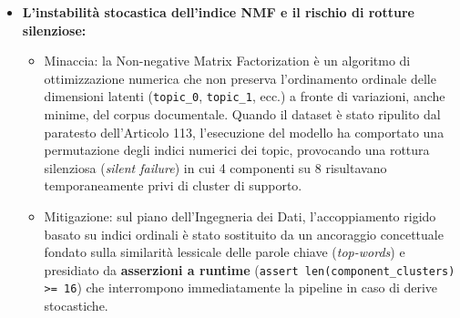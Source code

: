 \documentclass[12pt,a4paper,oneside]{report}
\begin{document}
\begin{itemize}
    \item \textbf{L'instabilità stocastica dell'indice NMF e il rischio di rotture silenziose:}
    \begin{itemize}
        \item Minaccia: la Non-negative Matrix Factorization è un algoritmo di ottimizzazione numerica che non preserva l'ordinamento ordinale delle dimensioni latenti (\texttt{topic\_0}, \texttt{topic\_1}, ecc.) a fronte di variazioni, anche minime, del corpus documentale. Quando il dataset è stato ripulito dal paratesto dell'Articolo 113, l'esecuzione del modello ha comportato una permutazione degli indici numerici dei topic, provocando una rottura silenziosa (\emph{silent failure}) in cui 4 componenti su 8 risultavano temporaneamente privi di cluster di supporto.
        \item Mitigazione: sul piano dell'Ingegneria dei Dati, l'accoppiamento rigido basato su indici ordinali è stato sostituito da un ancoraggio concettuale fondato sulla similarità lessicale delle parole chiave (\emph{top-words}) e presidiato da \textbf{asserzioni a runtime} (\texttt{assert len(component\_clusters) >= 16}) che interrompono immediatamente la pipeline in caso di derive stocastiche.
    \end{itemize}
    
\end{itemize}
\end{document}
